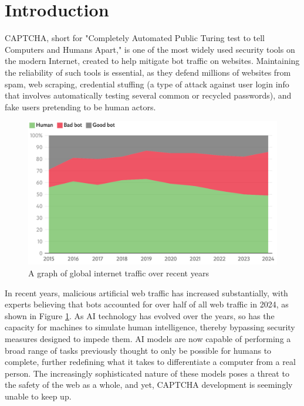\documentclass[sigplan,screen,nonacm]{acmart-tagged}
\begin{document}
\section{Introduction}
\label{sec:introduction}

CAPTCHA, short for "Completely Automated Public Turing test to tell Computers and Humans Apart," is one of the most widely used security tools on the modern Internet, created to help mitigate bot traffic on websites. Maintaining the reliability of such tools is essential, as they defend millions of websites from spam, web scraping, credential stuffing (a type of attack against user login info that involves automatically testing several common or recycled passwords), and fake users pretending to be human actors.

\begin{figure}[h]
\centering
\includegraphics[width=1\linewidth]{resources/bots}
\caption{A graph of global internet traffic over recent years \cite{independent}}
\label{fig:bots}
\end{figure}


In recent years, malicious artificial web traffic has increased substantially, with experts believing that bots accounted for over half of all web traffic in 2024, as shown in Figure \ref{fig:bots}. As AI technology has evolved over the years, so has the capacity for machines to simulate human intelligence, thereby bypassing security measures designed to impede them. AI models are now capable of performing a broad range of tasks previously thought to only be possible for humans to complete, further redefining what it takes to differentiate a computer from a real person. The increasingly sophisticated nature of these models poses a threat to the safety of the web as a whole, and yet, CAPTCHA development is seemingly unable to keep up.
\end{document}
